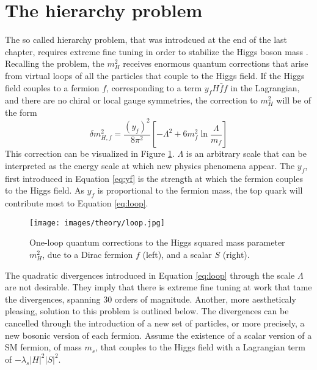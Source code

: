 \section{The hierarchy problem}
\noindent\justify
The so called hierarchy problem, that was introdcued at the end of the last chapter, requires extreme fine tuning in order to stabilize the Higgs boson mass \cite{Martin:1997ns}. 
Recalling the problem, the $m_{H}^{2}$ receives enormous quantum corrections that arise from virtual loops of all the particles that couple to the Higgs field. 
If the Higgs field couples to a fermion $f$, corresponding to a term $y_{f}H\bar{f}f$ in the Lagrangian, and there are no chiral or local gauge symmetries, the correction to $m_{H}^{2}$ will be of the form
\begin{equation}
\delta m_{H,f}^{2}=\frac{(y_{f})^{2}}{8\pi^{2}}\left[-\Lambda^{2} +6m_{f}^{2}\ln\frac{\Lambda}{m_{f}}\right]
\label{eq:loop}
\end{equation}                                                                                                
This correction can be visualized in Figure \ref{fig:loop}.
$\Lambda$ is an arbitrary scale that can be interpreted as the energy scale at which new physics phenomena appear. 
The $y_{f}$, first introduced in Equation \ref{eq:yf} is the strength at which the fermion couples to the Higgs field. 
As $y_{f}$ is proportional to the fermion mass, the top quark will contribute most to Equation \ref{eq:loop}.
\begin{figure}[htbp!]
\begin{center}
    \texttt{[image: images/theory/loop.jpg]}
\caption{One-loop quantum corrections to the Higgs squared mass parameter $m_H^2$, due to a Dirac fermion $f$ (left), and a scalar $S$ (right).}
\label{fig:loop}
\end{center}
\end{figure}                                     
The quadratic divergences introduced in Equation \ref{eq:loop} through the scale $\Lambda$ are not desirable. 
They imply that there is extreme fine tuning at work that tame the divergences, spanning 30 orders of magnitude.
Another, more aestheticaly pleasing, solution to this problem is outlined below.    
The divergences can be cancelled through the introduction of a new set of particles, or more precisely, a new bosonic version of each fermion. 
Assume the existence of a scalar version of a SM fermion, of mass $m_{s}$, that couples to the Higgs field with a Lagrangian term of $-\lambda_{s}|H|^{2}|S|^{2}$. 
